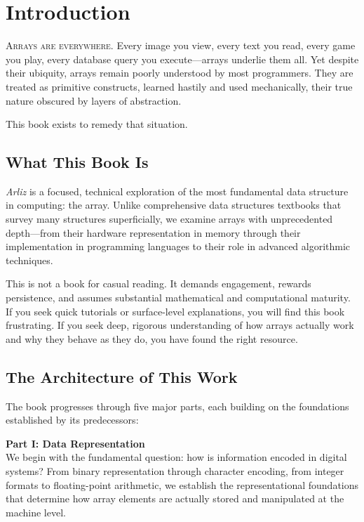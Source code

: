 \chapter*{Introduction}

\lettrine{A}{rrays are everywhere}. Every image you view, every text you read, every game you play, every database query you execute—arrays underlie them all. Yet despite their ubiquity, arrays remain poorly understood by most programmers. They are treated as primitive constructs, learned hastily and used mechanically, their true nature obscured by layers of abstraction.

This book exists to remedy that situation.

\section*{What This Book Is}

\textit{Arliz} is a focused, technical exploration of the most fundamental data structure in computing: the array. Unlike comprehensive data structures textbooks that survey many structures superficially, we examine arrays with unprecedented depth—from their hardware representation in memory through their implementation in programming languages to their role in advanced algorithmic techniques.

This is not a book for casual reading. It demands engagement, rewards persistence, and assumes substantial mathematical and computational maturity. If you seek quick tutorials or surface-level explanations, you will find this book frustrating. If you seek deep, rigorous understanding of how arrays actually work and why they behave as they do, you have found the right resource.

\section*{The Architecture of This Work}

The book progresses through five major parts, each building on the foundations established by its predecessors:

\textbf{Part I: Data Representation}\\
We begin with the fundamental question: how is information encoded in digital systems? From binary representation through character encoding, from integer formats to floating-point arithmetic, we establish the representational foundations that determine how array elements are actually stored and manipulated at the machine level.


